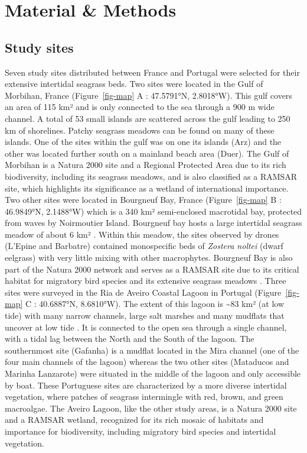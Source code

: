 \documentclass[
  number]{elsarticle}
\begin{document}
\section{Material \& Methods}\label{material-methods}

\subsection{Study sites}\label{study-sites}

Seven study sites distributed between France and Portugal were selected
for their extensive intertidal seagrass beds. Two sites were located in
the Gulf of Morbihan, France (Figure~\ref{fig-map} A : 47.5791°N,
2.8018°W). This gulf covers an area of 115 km² and is only connected to
the sea through a 900 m wide channel. A total of 53 small islands are
scattered across the gulf leading to 250 km of shorelines. Patchy
seagrass meadows can be found on many of these islands. One of the sites
within the gulf was on one its islands (Arz) and the other was located
further south on a mainland beach area (Duer). The Gulf of Morbihan is a
Natura 2000 site and a Regional Protected Area due to its rich
biodiversity, including its seagrass meadows, and is also classified as
a RAMSAR site, which highlights its significance as a wetland of
international importance. Two other sites were located in Bourgneuf Bay,
France (Figure~\ref{fig-map} B : 46.9849°N, 2.1488°W) which is a 340 km²
semi-enclosed macrotidal bay, protected from waves by Noirmoutier
Island. Bourgneuf bay hosts a large intertidal seagrass meadow of about
6 km² \citep{ZOFFOLI2020112020}. Within this meadow, the sites observed
by drones (L'Epine and Barbatre) contained monospecific beds of
\emph{Zostera noltei} (dwarf eelgrass) with very little mixing with
other macrophytes. Bourgneuf Bay is also part of the Natura 2000 network
and serves as a RAMSAR site due to its critical habitat for migratory
bird species and its extensive seagrass meadows \citep{Zoffoli2022}.
Three sites were surveyed in the Ria de Aveiro Coastal Lagoon in
Portugal (Figure~\ref{fig-map} C : 40.6887°N, 8.6810°W). The extent of
this lagoon is \textasciitilde83 km² (at low tide) with many narrow
channels, large salt marshes and many mudflats that uncover at low tide
\citep{sousa2017blue}. It is connected to the open sea through a single
channel, with a tidal lag between the North and the South of the lagoon.
The southernmost site (Gafanha) is a mudflat located in the Mira channel
(one of the four main channels of the lagoon) whereas the two other
sites (Mataducos and Marinha Lanzarote) were situated in the middle of
the lagoon and only accessible by boat. These Portuguese sites are
characterized by a more diverse intertidal vegetation, where patches of
seagrass intermingle with red, brown, and green macroalgae. The Aveiro
Lagoon, like the other study areas, is a Natura 2000 site and a RAMSAR
wetland, recognized for its rich mosaic of habitats and importance for
biodiversity, including migratory bird species and intertidal
vegetation.
\end{document}
